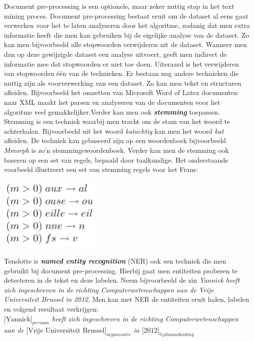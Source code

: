 Document pre-processing is een optionele, maar zeker nuttig stap in het text mining proces. Document pre-processing bestaat eruit om de dataset al eens gaat verwerken voor het te laten analyseren door het algoritme, zodanig dat men extra informatie heeft  die men kan gebruiken bij de eigelijke analyse van de dataset. Zo kan men bijvoorbeeld alle stopwoorden verwijderen uit de dataset. Wanneer men dan op deze gewijzigde dataset een analyse uitvoert, geeft men indirect de informatie mee dat stopwoorden er niet toe doen. Uiteraard is het verwijderen van stopwoorden \'e\'en van de technieken.  Er bestaan nog andere technieken die nuttig zijn als voorverwerking van een dataset. Zo kan men tekst en structuren afleiden. Bijvoorbeeld het omzetten van Microsoft Word of Latex documenten naar XML maakt het parsen en analyseren van de documenten voor het algoritme veel gemakkelijker.Verder kan men ook \textbf{\textit{stemming}} toepassen. Stemming is een techniek waarbij men tracht om de stam van het woord te achterhalen. Bijvoorbeeld uit het woord \textit{katachtig} kan men het woord \textit{kat} afleiden. De techniek kan gebaseerd zijn op een woordenboek bijvoorbeeld \textit{Mmorph} \cite{petitpierre1995mmorph} is zo'n stemmingswoordenboek. Verder kan men de stemming ook baseren op een set van regels, bepaald door taalkundige. Het onderstaande voorbeeld illustreert een set van stemming regels voor het Frans:
\begin{center}
  \includegraphics[width=5cm]{stemming_regels_frans}
\end{center}
Tenslotte is \textbf{\textit{named entity recognition}} (NER) ook een techniek die men gebruikt bij document pre-processing. Hierbij gaat men entiteiten proberen te detecteren in de tekst en deze labelen. Neem bijvoorbeeld de zin \textit{Yannick heeft zich ingeschreven in de richting Computerwetenschappen aan de Vrije Universiteit Brussel in 2012}. Men kan met NER de entiteiten eruit halen, labelen en volgend resultaat verkrijgen:\\ \textit{$\text{[Yannick]}_{persoon}$ heeft zich ingeschreven in de richting Computerwetenschappen aan de $\text{[Vrije Universiteit Brussel]}_{organisatie}$ in $\text{[2012]}_{tijdsaanduiding}$}
